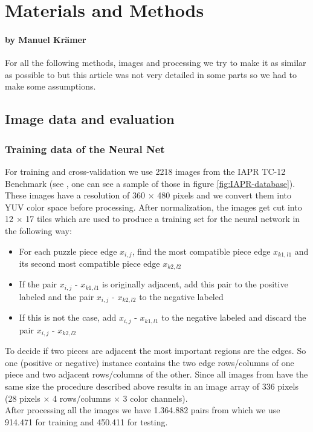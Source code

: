 \documentclass[11pt]{report}
\begin{document}
\chapter{Materials and Methods}
\subsubsection*{by Manuel Krämer}

For all the following methods, images and processing we try to make it as
similar as possible to \cite{sholomon2016dnn} but this article was not very
detailed in some parts so we had to make some assumptions.

\section{Image data and evaluation}
\subsection{Training data of the Neural Net}
For training and cross-validation we use 2218 images from the IAPR TC-12 Benchmark (see \cite{grubinger06}, one can see a sample of those in figure \ref{fig:IAPR-database}). These images have a resolution of 360 $\times$ 480 pixels and we convert them into YUV color space before processing. After normalization, the images get cut into 12 $\times$ 17 tiles which are used to produce a training set for the neural network in the following way:
\begin{itemize}
	\item For each puzzle piece edge $x_{i,j}$, find the most compatible piece edge $x_{k1,l1}$ and its second most compatible piece edge $x_{k2,l2}$
	\item  If the pair $x_{i,j}$ - $x_{k1,l1}$ is originally adjacent, add this pair to the positive labeled and the pair $x_{i,j}$ - $x_{k2,l2}$ to the negative labeled
	\item If this is not the case, add $x_{i,j}$ - $x_{k1,l1}$ to the negative labeled and discard the pair $x_{i,j}$ - $x_{k2,l2}$
\end{itemize}
To decide if two pieces are adjacent the most important regions are the edges. So one (positive or negative) instance contains the two edge rows/columns of one piece and two adjacent rows/columns of the other. Since all images from \cite{grubinger06} have the same size the procedure described above results in an image array of 336 pixels (28 pixels $\times$ 4 rows/columns $\times$ 3 color channels). \\
After processing all the images we have 1.364.882 pairs from which we use 914.471 for training and 450.411 for testing.
\end{document}
